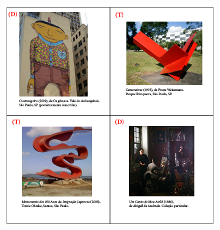%

\begin{figure}[htpb!]
\includegraphics[width=\textwidth]{../ilustracoes/ART5/SAEB_5ANO_ART_FIGURA4.png}
\end{figure}


